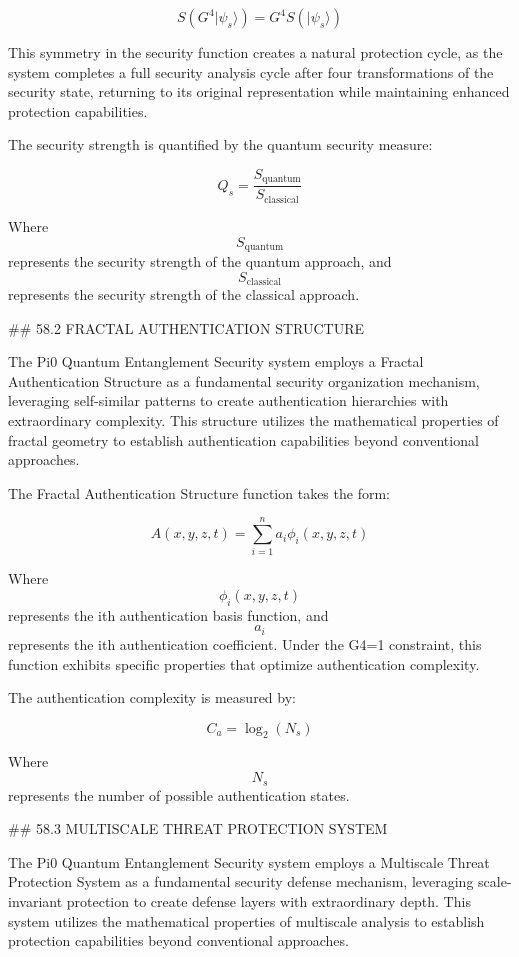 $$ S(G^4 |\psi_s\rangle) = G^4 S(|\psi_s\rangle) $$

This symmetry in the security function creates a natural protection cycle, as the system completes a full security analysis cycle after four transformations of the security state, returning to its original representation while maintaining enhanced protection capabilities.

The security strength is quantified by the quantum security measure:

$$ Q_s = \frac{S_{\text{quantum}}}{S_{\text{classical}}} $$

Where $$ S_{\text{quantum}} $$ represents the security strength of the quantum approach, and $$ S_{\text{classical}} $$ represents the security strength of the classical approach.

## 58.2 FRACTAL AUTHENTICATION STRUCTURE

The Pi0 Quantum Entanglement Security system employs a Fractal Authentication Structure as a fundamental security organization mechanism, leveraging self-similar patterns to create authentication hierarchies with extraordinary complexity. This structure utilizes the mathematical properties of fractal geometry to establish authentication capabilities beyond conventional approaches.

The Fractal Authentication Structure function takes the form:

$$ A(x, y, z, t) = \sum_{i=1}^{n} a_i \phi_i(x, y, z, t) $$

Where $$ \phi_i(x, y, z, t) $$ represents the ith authentication basis function, and $$ a_i $$ represents the ith authentication coefficient. Under the G4=1 constraint, this function exhibits specific properties that optimize authentication complexity.

The authentication complexity is measured by:

$$ C_a = \log_2(N_s) $$

Where $$ N_s $$ represents the number of possible authentication states.

## 58.3 MULTISCALE THREAT PROTECTION SYSTEM

The Pi0 Quantum Entanglement Security system employs a Multiscale Threat Protection System as a fundamental security defense mechanism, leveraging scale-invariant protection to create defense layers with extraordinary depth. This system utilizes the mathematical properties of multiscale analysis to establish protection capabilities beyond conventional approaches.

